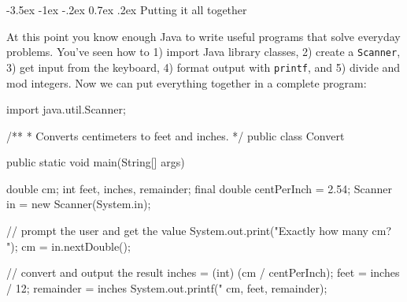 \documentclass[12pt]{book}
\makeatletter
\theoremstyle{exercise}
\newcommand{\java}[1]{\verb"#1"}
\renewcommand{\section}{\@startsection{section}{1}{\z@}%
    {-3.5ex \@plus -1ex \@minus -.2ex}%
    {0.7ex \@plus.2ex}%
    {\normalfont\Large\bfseries}}
\newcommand{\java}[1]{\lstinline{#1}} %
\makeatother
\begin{document}
\section{Putting it all together}






At this point you know enough Java to write useful programs that solve everyday problems.
You've seen how to 1) import Java library classes, 2) create a \java{Scanner}, 3) get input from the keyboard, 4) format output with \java{printf}, and 5) divide and mod integers.
Now we can put everything together in a complete program:


\begin{code}
import java.util.Scanner;

/**
 * Converts centimeters to feet and inches.
 */
public class Convert {

    public static void main(String[] args) {
        double cm;
        int feet, inches, remainder;
        final double centPerInch = 2.54;
        Scanner in = new Scanner(System.in);

        // prompt the user and get the value
        System.out.print("Exactly how many cm? ");
        cm = in.nextDouble();

        // convert and output the result
        inches = (int) (cm / centPerInch);
        feet = inches / 12;
        remainder = inches %
        System.out.printf("%
                          cm, feet, remainder);
    }
}
\end{code}
\end{document}
